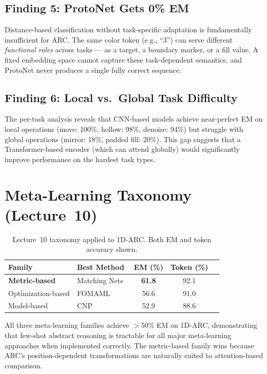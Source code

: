 \documentclass[11pt,a4paper]{article}
\begin{document}
\subsection{Finding 5: ProtoNet Gets 0\% EM}
Distance-based classification without task-specific adaptation is fundamentally insufficient for ARC. The same color token (e.g., ``3'') can serve different \emph{functional roles} across tasks --- as a target, a boundary marker, or a fill value. A fixed embedding space cannot capture these task-dependent semantics, and ProtoNet never produces a single fully correct sequence.

\subsection{Finding 6: Local vs.\ Global Task Difficulty}
The per-task analysis reveals that CNN-based models achieve near-perfect EM on local operations (move: 100\%, hollow: 98\%, denoise: 94\%) but struggle with global operations (mirror: 18\%, padded fill: 20\%). This gap suggests that a Transformer-based encoder (which can attend globally) would significantly improve performance on the hardest task types.

\section{Meta-Learning Taxonomy (Lecture~10)}

\begin{table}[H]\centering
\caption{Lecture~10 taxonomy applied to 1D-ARC. Both EM and token accuracy shown.}
\vspace{4pt}
\begin{tabular}{llccc}\toprule
\textbf{Family} & \textbf{Best Method} & \textbf{EM (\%)} & \textbf{Token (\%)} \\\midrule
\rowcolor{green!8} \textbf{Metric-based} & Matching Nets~\cite{vinyals2016} & \textcolor{bestgreen}{\textbf{61.8}} & 92.1 \\
Optimization-based & FOMAML~\cite{finn2017} & 56.6 & 91.0 \\
Model-based & CNP~\cite{garnelo2018} & 52.9 & 88.6 \\
\bottomrule\end{tabular}
\end{table}

All three meta-learning families achieve $>$50\% EM on 1D-ARC, demonstrating that few-shot abstract reasoning is tractable for all major meta-learning approaches when implemented correctly. The metric-based family wins because ARC's position-dependent transformations are naturally suited to attention-based comparison.
\end{document}
